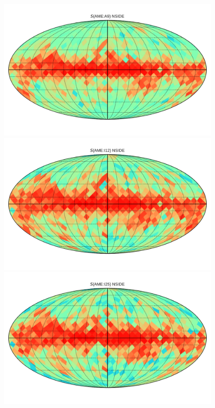 {      \begin{figure}

        \includegraphics[width=\textwidth/3]{../Plots/Allsky_Corr/Spearman_Map_nside8_AMEtoA9.pdf}
        \includegraphics[width=\textwidth/3]{../Plots/Allsky_Corr/Spearman_Map_nside8_AMEtoI12.pdf}
        \includegraphics[width=\textwidth/3]{../Plots/Allsky_Corr/Spearman_Map_nside8_AMEtoI25.pdf}

\end{figure}}
